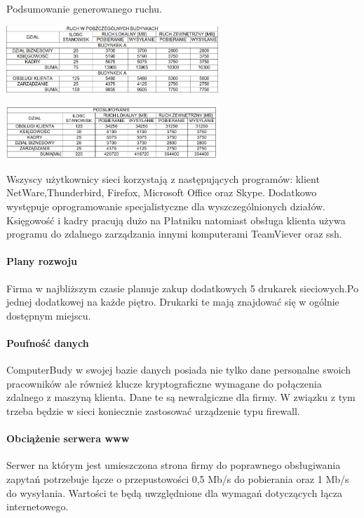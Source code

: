 \documentclass{report}
\begin{document}
\begin{table}[H]

\centering
\caption{Podsumowanie generowanego ruchu. \label{tab:analiza podsumowanie}}

\includegraphics[width=0.6\textwidth]{./obrazki/ruch_tabele/budynki.png}

\hspace{0,5cm}

      \includegraphics[width=0.6\textwidth]{./obrazki/ruch_tabele/podsumowanie.png}     
 
\end{table}




Wszyscy użytkownicy sieci korzystają z następujących programów: klient NetWare,Thunderbird, Firefox, Microsoft Office oraz Skype. Dodatkowo występuje 
oprogramowanie specjalistyczne dla wyszczególnionych działów. Księgowość i kadry pracują dużo na Płatniku natomiast obsługa klienta używa programu
do zdalnego zarządzania innymi komputerami TeamViever oraz ssh.

\paragraph{Plany rozwoju}Firma w najbliższym czasie planuje zakup dodatkowych 5 drukarek sieciowych.Po jednej dodatkowej na każde piętro. Drukarki te mają znajdować się
w ogólnie dostępnym miejscu.

\paragraph{Poufność danych}ComputerBudy w swojej bazie danych posiada nie tylko dane personalne swoich pracowników ale również klucze kryptograficzne wymagane do połączenia zdalnego
z maszyną klienta. Dane te są newralgiczne dla firmy. W związku z tym trzeba będzie w sieci koniecznie zastosować urządzenie typu firewall.

\paragraph{Obciążenie serwera www}Serwer na którym jest umieszczona strona firmy do poprawnego obsługiwania zapytań potrzebuje łącze o przepustowości 0,5 Mb/s do pobierania oraz
1 Mb/s do wysyłania. Wartości te będą uwzględnione dla wymagań dotyczących łącza internetowego.
\end{document}
